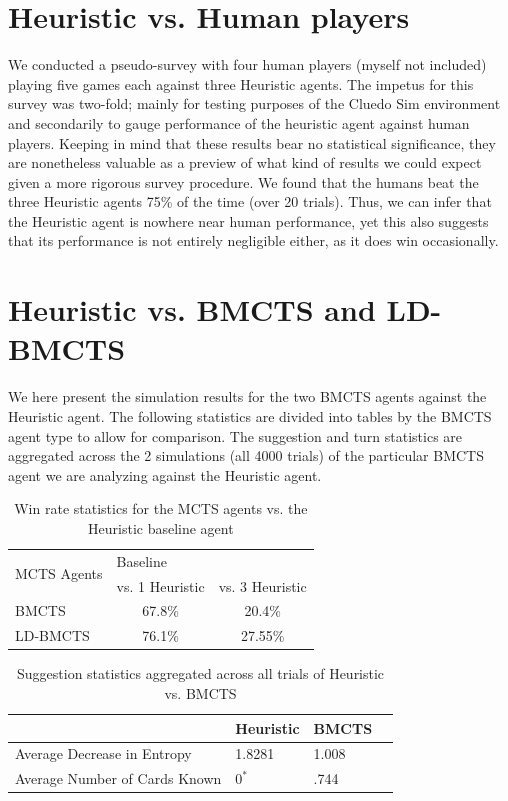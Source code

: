 \documentclass[msc, ai, twoside, notimes, logo, parskip, leftchapter, normalheadings]{infthesis}
\begin{document}
\section{Heuristic vs. Human players}
We conducted a pseudo-survey with four human players (myself not included) playing five games each against three Heuristic agents. The impetus for this survey was two-fold; mainly for testing purposes of the Cluedo Sim environment and secondarily to gauge performance of the heuristic agent against human players. Keeping in mind that these results bear no statistical significance, they are nonetheless valuable as a preview of what kind of results we could expect given a more rigorous survey procedure. We found that the humans beat the three Heuristic agents 75\% of the time (over 20 trials). Thus, we can infer that the Heuristic agent is nowhere near human performance, yet this also suggests that its performance is not entirely negligible either, as it does win occasionally.

\section{Heuristic vs. BMCTS and LD-BMCTS}
We here present the simulation results for the two BMCTS agents against the Heuristic agent. The following statistics are divided into tables by the BMCTS agent type to allow for comparison. The suggestion and turn statistics are aggregated across the 2 simulations (all 4000 trials) of the particular BMCTS agent we are analyzing against the Heuristic agent. 

\begin{table}[h!]
\centering
\caption{Win rate statistics for the MCTS agents vs. the Heuristic baseline agent}
\begin{tabular}{l|llll}
\multirow{2}{*}{MCTS Agents} & \multicolumn{4}{l}{Baseline} \\ \cline{2-5} 
& \multicolumn{2}{l|}{vs. 1 Heuristic} & \multicolumn{2}{l}{vs. 3 Heuristic} \\ \hline \hline
BMCTS & \multicolumn{2}{c}{67.8\%} & \multicolumn{2}{c}{20.4\%} \\
LD-BMCTS & \multicolumn{2}{c}{76.1\%} & \multicolumn{2}{c}{27.55\%} 
\end{tabular}
\end{table}

\begin{table}[h!]
\centering
\caption{Suggestion statistics aggregated across all trials of Heuristic vs. BMCTS}
\begin{tabular}{l|lll}
& \multicolumn{1}{l|}{Heuristic} & \multicolumn{1}{l|}{BMCTS}\\ \hline \hline
Average Decrease in Entropy & 1.8281 & 1.008 \\
Average Number of Cards Known & \(0^{*}\) & .744 \\
\end{tabular}
\end{table}
\end{document}

